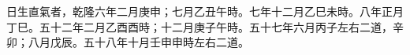 \begin{pinyinscope}
日生直氣者，乾隆六年二月庚申；七月乙丑午時。七年十二月乙巳未時。八年正月丁巳。五十二年二月乙酉酉時；十二月庚子午時。五十七年六月丙子左右二道，辛卯；八月戊辰。五十八年十月壬申申時左右二道。


\end{pinyinscope}